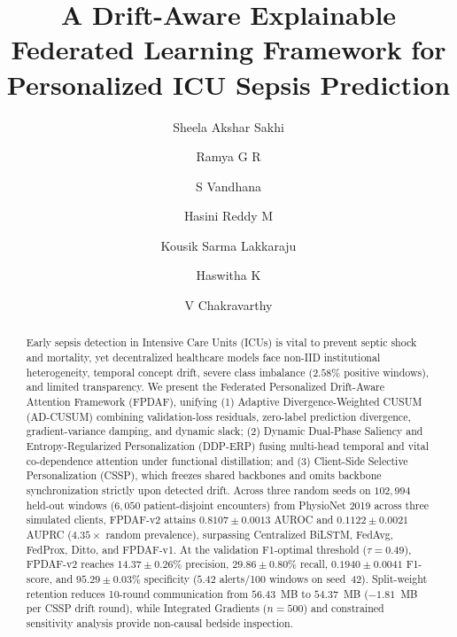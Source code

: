 \documentclass{llncs}
\begin{document}
\title{A Drift-Aware Explainable Federated Learning Framework for Personalized ICU Sepsis Prediction}

\author{Sheela Akshar Sakhi \and Ramya G R \and S Vandhana \and Hasini Reddy M \and Kousik Sarma Lakkaraju \and Haswitha K \and V Chakravarthy}


\maketitle
\begin{abstract}
Early sepsis detection in Intensive Care Units (ICUs) is vital to prevent septic shock and mortality, yet decentralized healthcare models face non-IID institutional heterogeneity, temporal concept drift, severe class imbalance ($2.58\%$ positive windows), and limited transparency. We present the Federated Personalized Drift-Aware Attention Framework (FPDAF), unifying (1) Adaptive Divergence-Weighted CUSUM (AD-CUSUM) combining validation-loss residuals, zero-label prediction divergence, gradient-variance damping, and dynamic slack; (2) Dynamic Dual-Phase Saliency and Entropy-Regularized Personalization (DDP-ERP) fusing multi-head temporal and vital co-dependence attention under functional distillation; and (3) Client-Side Selective Personalization (CSSP), which freezes shared backbones and omits backbone synchronization strictly upon detected drift. Across three random seeds on $102{,}994$ held-out windows ($6{,}050$ patient-disjoint encounters) from PhysioNet 2019 across three simulated clients, FPDAF-v2 attains $0.8107\pm 0.0013$ AUROC and $0.1122\pm 0.0021$ AUPRC ($4.35\times$ random prevalence), surpassing Centralized BiLSTM, FedAvg, FedProx, Ditto, and FPDAF-v1. At the validation F1-optimal threshold ($\tau=0.49$), FPDAF-v2 reaches $14.37\pm 0.26\%$ precision, $29.86\pm 0.80\%$ recall, $0.1940\pm 0.0041$ F1-score, and $95.29\pm 0.03\%$ specificity ($5.42$ alerts/100 windows on seed~42). Split-weight retention reduces 10-round communication from $56.43$~MB to $54.37$~MB ($-1.81$~MB per CSSP drift round), while Integrated Gradients ($n=500$) and constrained sensitivity analysis provide non-causal bedside inspection.

\end{abstract}
\end{document}
